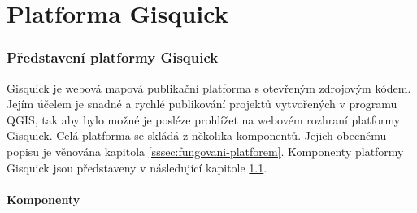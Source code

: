 \newpage
\part{Platforma Gisquick}
\newpage

\section{Představení platformy Gisquick}

Gisquick je webová mapová publikační platforma s otevřeným zdrojovým kódem. Jejím
účelem je snadné a rychlé publikování projektů vytvořených v programu
QGIS, tak aby bylo možné je posléze prohlížet na webovém rozhraní platformy
Gisquick.
Celá platforma se skládá z několika komponentů. Jejich obecnému popisu je věnována kapitola \ref{sssec:fungovani-platforem}. Komponenty platformy Gisquick jsou představeny
v následující kapitole \ref{sssec:gisquick-komponenty}.

\subsection{Komponenty}
\label{sssec:gisquick-komponenty}


